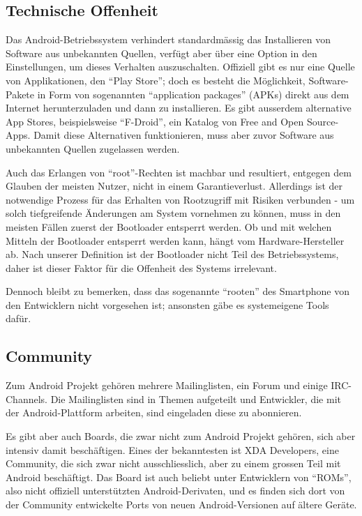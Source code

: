 \subsection{Technische Offenheit}
Das Android-Betriebssystem verhindert standardmässig das Installieren von Software aus unbekannten Quellen, verfügt aber über eine Option in den Einstellungen, um dieses Verhalten auszuschalten. Offiziell gibt es nur eine Quelle von Applikationen, den ``Play Store''; doch es besteht die Möglichkeit, Software-Pakete in Form von sogenannten ``application packages'' (APKs) direkt aus dem Internet herunterzuladen und dann zu installieren. Es gibt ausserdem alternative App Stores, beispielsweise ``F-Droid'', ein Katalog von Free and Open Source-Apps\cite{online:f-droid}. Damit diese Alternativen funktionieren, muss aber zuvor Software aus unbekannten Quellen zugelassen werden.

Auch das Erlangen von ``root''-Rechten ist machbar und resultiert, entgegen dem Glauben der meisten Nutzer, nicht in einem Garantieverlust\cite{online:xda-rooting-warranty}. Allerdings ist der notwendige Prozess für das Erhalten von Rootzugriff mit Risiken verbunden - um solch tiefgreifende Änderungen am System vornehmen zu können, muss in den meisten Fällen zuerst der Bootloader entsperrt werden. 
Ob und mit welchen Mitteln der Bootloader entsperrt werden kann, hängt vom Hardware-Hersteller ab\cite{online:apu-what-is-unlocking}. Nach unserer Definition ist der Bootloader nicht Teil des Betriebssystems, daher ist dieser Faktor für die Offenheit des Systems irrelevant.

Dennoch bleibt zu bemerken, dass das sogenannte ``rooten'' des Smartphone von den Entwicklern nicht vorgesehen ist; ansonsten gäbe es systemeigene Tools dafür.\\

\subsection{Community}
Zum Android Projekt gehören mehrere Mailinglisten, ein Forum und einige IRC-Channels\cite{online:android-community}. Die Mailinglisten sind in Themen aufgeteilt und Entwickler, die mit der Android-Plattform arbeiten, sind eingeladen diese zu abonnieren\cite{online:android-community}.

Es gibt aber auch Boards, die zwar nicht zum Android Projekt gehören, sich aber intensiv damit beschäftigen. Eines der bekanntesten ist XDA Developers\cite{online:xda-developers}, eine Community, die sich zwar nicht ausschliesslich, aber zu einem grossen Teil mit Android beschäftigt. Das Board ist auch beliebt unter Entwicklern von ``ROMs'', also nicht offiziell unterstützten Android-Derivaten, und es finden sich dort von der Community entwickelte Ports von neuen Android-Versionen auf ältere Geräte.\\

